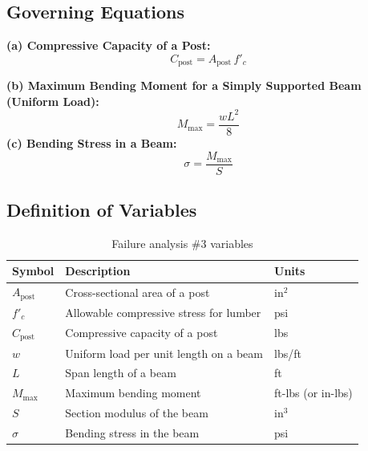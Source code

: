 \documentclass[12pt]{report}
\begin{document}
\subsection{Governing Equations}
\textbf{(a) Compressive Capacity of a Post:}
\begin{equation}
    C_{\text{post}} = A_{\text{post}} \, f'_c
    \tag{1}
\end{equation}

\textbf{(b) Maximum Bending Moment for a Simply Supported Beam (Uniform Load):}
\begin{equation}
    M_{\text{max}} = \frac{w L^2}{8}
    \tag{2}
\end{equation}
\textbf{(c) Bending Stress in a Beam:}
\begin{equation}
    \sigma = \frac{M_{\text{max}}}{S}
    \tag{3}
\end{equation}
\subsection{Definition of Variables}

\begin{table}[ht]
\centering
\caption{Failure analysis \#3 variables}
\begin{tabular}{@{}lll@{}}
\toprule
\textbf{Symbol} & \textbf{Description} & \textbf{Units} \\ \midrule
\(A_{\text{post}}\) & Cross-sectional area of a post & in\(^2\) \\
\(f'_c\) & Allowable compressive stress for lumber & psi \\
\(C_{\text{post}}\) & Compressive capacity of a post & lbs \\[6pt]
\(w\) & Uniform load per unit length on a beam & lbs/ft \\
\(L\) & Span length of a beam & ft \\
\(M_{\text{max}}\) & Maximum bending moment & ft-lbs (or in-lbs) \\
\(S\) & Section modulus of the beam & in\(^3\) \\
\(\sigma\) & Bending stress in the beam & psi \\ \bottomrule
\end{tabular}
\end{table}
\end{document}
